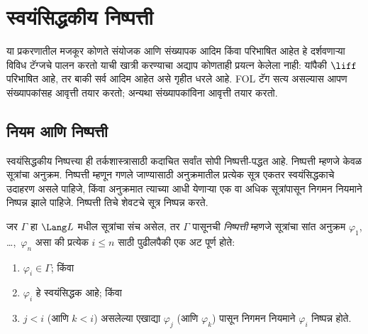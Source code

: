 \chapter{स्वयंसिद्धकीय निष्पत्ती}\label{fol:axd::chap}
\begin{editorial}
  या प्रकरणातील मजकूर कोणते संयोजक आणि संख्यापक आदिम किंवा परिभाषित
  आहेत हे दर्शवणाऱ्या विविध टॅग्जचे पालन करतो याची खात्री करण्याचा अद्याप
  कोणताही प्रयत्न केलेला नाही: यांपैकी $\liff$ परिभाषित आहे, तर बाकी
  सर्व आदिम आहेत असे गृहीत धरले आहे. FOL टॅग सत्य
  असल्यास आपण संख्यापकांसह आवृत्ती तयार करतो; अन्यथा संख्यापकांविना
  आवृत्ती तयार करतो.
\end{editorial}









\section{नियम आणि निष्पत्ती}\label{fol:axd:rul:sec}

\begin{explain}
  स्वयंसिद्धकीय निष्पत्त्या ही तर्कशास्त्रासाठी कदाचित सर्वांत सोपी
  निष्पत्ती-पद्धत आहे. निष्पत्ती म्हणजे केवळ सूत्रांचा
  अनुक्रम. निष्पत्ती म्हणून गणले जाण्यासाठी अनुक्रमातील प्रत्येक
  सूत्र एकतर स्वयंसिद्धकाचे उदाहरण असले पाहिजे, किंवा अनुक्रमात
  त्याच्या आधी येणाऱ्या एक वा अधिक सूत्रांपासून निगमन नियमाने
  निष्पन्न झाले पाहिजे. निष्पत्ती तिचे शेवटचे सूत्र
  निष्पन्न करते.
\end{explain}

\begin{defn}[निष्पन्नता]
जर $\Gamma$ हा $\Lang L$ मधील सूत्रांचा संच असेल, तर
$\Gamma$ पासूनची \emph{निष्पत्ती} म्हणजे सूत्रांचा सांत अनुक्रम
$\varphi_1$, \dots,~$\varphi_n$ असा की प्रत्येक $i \le n$ साठी पुढीलपैकी एक अट
पूर्ण होते:
\begin{enumerate}
\item $\varphi_i \in \Gamma$; किंवा
\item $\varphi_i$ हे स्वयंसिद्धक आहे; किंवा
\item $j < i$ (आणि $k < i$) असलेल्या एखाद्या $\varphi_j$ (आणि $\varphi_k$)
  पासून निगमन नियमाने $\varphi_i$ निष्पन्न होते.
\end{enumerate}
\end{defn}

